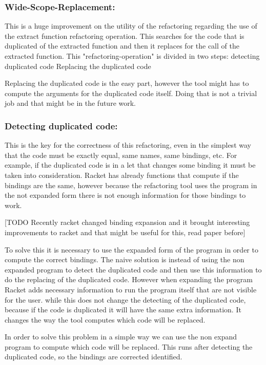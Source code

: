 \subsubsection{Wide-Scope-Replacement:}
This is a huge improvement on the utility of the refactoring regarding the use
of the extract function refactoring operation. This searches for the code that is
duplicated of the extracted function and then it replaces for the call of the
extracted function.
This "refactoring-operation" is divided in two steps:
detecting duplicated code
Replacing the duplicated code

Replacing the duplicated code is the easy part, however the tool might has to compute
the arguments for the duplicated code itself. Doing that is not a trivial job and
that might be in the future work.

\subsubsection{Detecting duplicated code:}
This is the key for the correctness of this refactoring, even in the simplest way
that the code must be exactly equal, same names, same bindings, etc.
For example, if the duplicated code is in a let that changes some binding it must
be taken into consideration. Racket has already functions that compute if the bindings
are the same, however because the refactoring tool uses the program in the not expanded
form there is not enough information for those bindings to work.

[TODO Recently racket changed binding expansion and it brought interesting improvements
to racket and that might be useful for this, read paper before]

To solve this it is necessary to use the expanded form of the program in order
to compute the correct bindings. The naive solution is instead of using the
non expanded program to detect the duplicated code and then use this information
to do the replacing of the duplicated code. However when expanding the program
Racket adds necessary information to run the program itself that are not visible
for the user. while this does not change the detecting of the duplicated code,
because if the code is duplicated it will have the same extra information. It changes
the way the tool computes which code will be replaced.

In order to solve this problem in a simple way we can use the non expand program
to compute which code will be replaced. This runs after detecting the duplicated
code, so the bindings are corrected identified.

